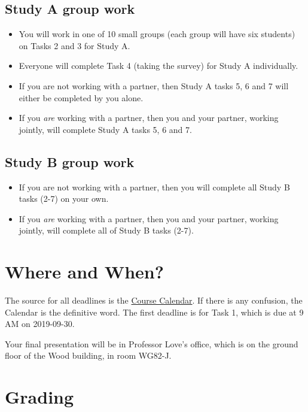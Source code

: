 \documentclass[]{book}
\providecommand{\tightlist}{%
  \setlength{\itemsep}{0pt}\setlength{\parskip}{0pt}}
\begin{document}
\hypertarget{study-a-group-work}{%
\subsection{Study A group work}\label{study-a-group-work}}

\begin{itemize}
\tightlist
\item
  You will work in one of 10 small groups (each group will have six students) on Tasks 2 and 3 for Study A.
\item
  Everyone will complete Task 4 (taking the survey) for Study A individually.
\item
  If you are not working with a partner, then Study A tasks 5, 6 and 7 will either be completed by you alone.
\item
  If you \emph{are} working with a partner, then you and your partner, working jointly, will complete Study A tasks 5, 6 and 7.
\end{itemize}

\hypertarget{study-b-group-work}{%
\subsection{Study B group work}\label{study-b-group-work}}

\begin{itemize}
\tightlist
\item
  If you are not working with a partner, then you will complete all Study B tasks (2-7) on your own.
\item
  If you \emph{are} working with a partner, then you and your partner, working jointly, will complete all of Study B tasks (2-7).
\end{itemize}

\hypertarget{where-and-when}{%
\section{Where and When?}\label{where-and-when}}

The source for all deadlines is the \href{https://github.com/THOMASELOVE/2019-431/blob/master/calendar.md}{Course Calendar}. If there is any confusion, the Calendar is the definitive word. The first deadline is for Task 1, which is due at 9 AM on 2019-09-30.

Your final presentation will be in Professor Love's office, which is on the ground floor of the Wood building, in room WG82-J.

\hypertarget{grading}{%
\section{Grading}\label{grading}}
\end{document}
